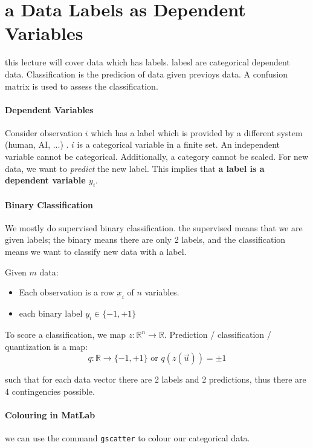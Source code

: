 \documentclass[12pt]{book}
\title{\coursetitle\linebreak\lecturename}
\author{\\Cain Susko\\ 
           \\ \\ \\
      Queen's University 
    \\School of Computing\\}
\begin{document}
\begin{titlepage}
        \maketitle
\end{titlepage}


\section*{a Data Labels as Dependent Variables}
this lecture will cover data which has labels. labesl are categorical dependent data.
Classification is the predicion of data given previoys data. A confusion matrix is
used to assess the classification.

\paragraph{Dependent Variables}
Consider observation $i$ which has a label which is provided by a different system (human, AI, ...)
. $i$ is a categorical variable in a finite set. An independent variable cannot be categorical. 
Additionally, a category cannot be scaled. For new data, we want to \textit{predict} the new
label. This implies that \textbf{a label is a dependent variable $y_i$}.

\paragraph{Binary Classification}
We mostly do supervised binary classification. the supervised means that we are given labels; the
binary means there are only 2 labels, and the classification means we want to classify
new data with a label.

Given $m$ data:
\begin{itemize}
        \item Each observation is a row $\underbar{x}_i$ of $n$ variables. 
        \item each binary label $y_i \in \{-1, +1\}$
\end{itemize}
To score a classification, we map $z:\mathbb{R}^n \rightarrow \mathbb{R}$. Prediction / 
classification / quantization is a map:
\[q : \mathbb{R} \rightarrow \{-1, +1\} \text{ or } q(z(\vec u)) = \pm 1\]

such that for each data vector there are 2 labels and 2 predictions, thus there are 4 contingencies
possible.

\paragraph{Colouring in MatLab}
we can use the command \texttt{gscatter} to colour our categorical data.
\pagebreak
\end{document}
